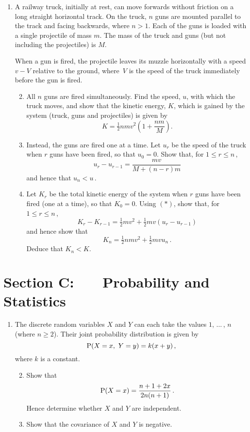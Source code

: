 \documentclass[a4, 11pt]{report}
\newlength{\qspace}
\newcounter{qnumber}
\newenvironment{question}%
 {\vspace{\qspace}
  \begin{enumerate}[\bfseries 1\quad][10]%
    \setcounter{enumi}{\value{qnumber}}%
    \item%
 }
{
  \end{enumerate}
  \filbreak
  \stepcounter{qnumber}
 }
\newenvironment{questionparts}[1][1]%
 {
  \begin{enumerate}[\bfseries (i)]%
    \setcounter{enumii}{#1}
    \addtocounter{enumii}{-1}
    \setlength{\itemsep}{5mm}
    \setlength{\parskip}{3pt}
 }
 {
  \end{enumerate}
 }
\def\P{{\rm P}}
\def\le{\leqslant}
\def\ge{\geqslant}
\begin{document}
\begin{question}
A railway truck, initially at rest, can move forwards
 without friction on a long straight \mbox{horizontal} track. 
On the truck, $n$ guns are mounted parallel to the track and 
facing backwards, where $n>1$. 
Each of the guns is loaded with a single projectile of mass $m$. 
The mass of the truck and guns (but not including the 
projectiles) is $M$. 

When a gun is fired, the projectile leaves its 
muzzle horizontally with a speed  $v-V$ relative to the ground, 
where~$V$ is the
speed of the truck immediately before the gun is fired.

\begin{questionparts}

\item All $n$ guns are fired simultaneously. 
Find the speed, $u$, with which the truck moves, 
and show that the  kinetic energy, $K$, which is gained by the system
(truck, guns and projectiles) is given by
\[
K=  \tfrac{1}{2}nmv^2\left(1   +\frac{nm}{M} \right)
.
\]

\item Instead, the guns are fired one at a time. 
Let $u_r$ be the speed  of the truck
when $r$ guns have been fired, so that $u_0= 0$. 
Show that, for $1\le r \le n\,$,  
\[
u_r - u_{r-1} = \frac{mv}{M+(n-r)m}
\tag{$*$}
\]
and hence that $u_n < u\,$.


\item 
Let $K_r$ 
be the total kinetic energy of the system 
when $r$ guns have been fired (one at a time), so that $K_0 = 0$. 
Using $(*)$, show that, for $1\le r\le n\,$,
\[
K_r -K_{r-1} = \tfrac 12 mv^2 + \tfrac12 mv (u_r-u_{r-1})
\]
and hence 
show that
\[
K_n = \tfrac{1}{2}nmv^2 +\tfrac{1}{2}mvu_n
\,.
\] 
Deduce that $K_n<K$.

\end{questionparts}
\end{question}



\newpage


\section*{Section C: \ \ \ Probability and Statistics}
\begin{question}
The discrete random variables $X$ and $Y$ can each take the values 
$1$, $\ldots\,$, $n$ (where $n\ge2$). Their joint probability distribution is given by
\[
\P(X=x, \  Y=y) = k(x+y) \,,
\] 
where $k$ is a  constant.
\begin{questionparts}

\item Show that \[
\P(X=x) = \dfrac{n+1+2x}{2n(n+1)}\,. 
\]
Hence determine whether $X$ and $Y$
are independent.


\item Show that the covariance of $X$ and $Y$ is negative.

\end{questionparts}
\end{question}
 
\end{document}
